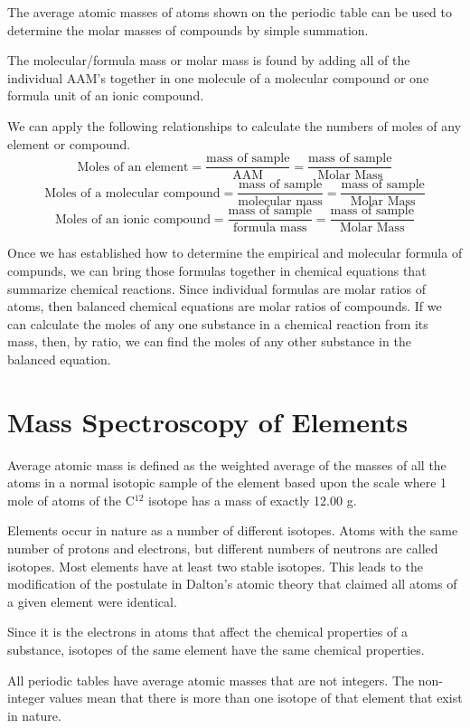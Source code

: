 \documentclass[../chem.tex]{subfiles}
\begin{document}
The average atomic masses of atoms shown on the periodic table can be used to determine the molar masses of compounds by simple summation.

The molecular/formula mass or molar mass is found by adding all of the individual AAM's together in one molecule of a molecular compound or one formula unit of an ionic compound.

We can apply the following relationships to calculate the numbers of moles of any element or compound.
\[\text{Moles of an element}=\frac{\text{mass of sample}}{\text{AAM}}=\frac{\text{mass of sample}}{\text{Molar Mass}}\]
\[\text{Moles of a molecular compound}=\frac{\text{mass of sample}}{\text{molecular mass}}=\frac{\text{mass of sample}}{\text{Molar Mass}}\]
\[\text{Moles of an ionic compound}=\frac{\text{mass of sample}}{\text{formula mass}}=\frac{\text{mass of sample}}{\text{Molar Mass}}\]

Once we has established how to determine the empirical and molecular formula of compunds, we can bring those formulas together in chemical equations 
that summarize chemical reactions. Since individual formulas are molar ratios of atoms, then balanced chemical equations are molar ratios of compounds.
If we can calculate the moles of any one substance in a chemical reaction from its mass, then, by ratio, we can find the moles of any other substance in the balanced equation.

\section{Mass Spectroscopy of Elements}
Average atomic mass is defined as the weighted average of the masses of all the atoms in a normal isotopic sample of the element 
based upon the scale where 1 mole of atoms of the C$^{12}$ isotope has a mass of exactly 12.00 g.

Elements occur in nature as a number of different isotopes. Atoms with the same number of protons and electrons, but different numbers of neutrons are called isotopes.
Most elements have at least two stable isotopes. This leads to the modification of the postulate in Dalton's atomic theory that claimed all atoms of a given element were identical.

Since it is the electrons in atoms that affect the chemical properties of a substance, isotopes of the same element have the same chemical properties.

All periodic tables have average atomic masses that are not integers. The non-integer values mean that there is more than one isotope of that element that exist in nature.
\end{document}
